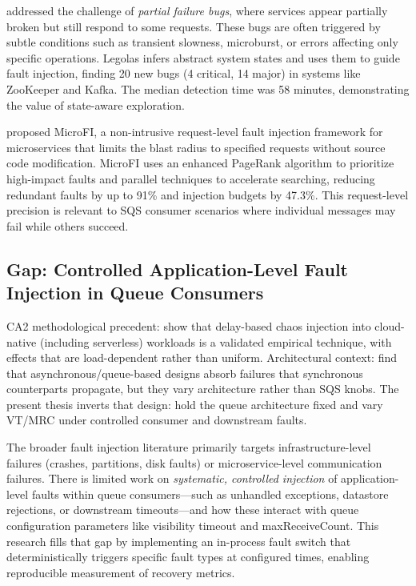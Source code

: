 \citet{Wu2024Legolas} addressed the challenge of \emph{partial failure bugs}, where services appear partially broken but still respond to some requests. These bugs are often triggered by subtle conditions such as transient slowness, microburst, or errors affecting only specific operations. Legolas infers abstract system states and uses them to guide fault injection, finding 20 new bugs (4 critical, 14 major) in systems like ZooKeeper and Kafka. The median detection time was 58 minutes, demonstrating the value of state-aware exploration.

\citet{Zhou2024MicroFI} proposed MicroFI, a non-intrusive request-level fault injection framework for microservices that limits the blast radius to specified requests without source code modification. MicroFI uses an enhanced PageRank algorithm to prioritize high-impact faults and parallel techniques to accelerate searching, reducing redundant faults by up to 91\% and injection budgets by 47.3\%. This request-level precision is relevant to SQS consumer scenarios where individual messages may fail while others succeed.

\subsection{Gap: Controlled Application-Level Fault Injection in Queue Consumers}

CA2 methodological precedent: \citet{AlSaidAhmad2024Chaos} show that delay-based chaos injection into cloud-native (including serverless) workloads is a validated empirical technique, with effects that are load-dependent rather than uniform. Architectural context: \citet{Bosilia2025AsyncResilience} find that asynchronous/queue-based designs absorb failures that synchronous counterparts propagate, but they vary architecture rather than SQS knobs. The present thesis inverts that design: hold the queue architecture fixed and vary VT/MRC under controlled consumer and downstream faults.

The broader fault injection literature primarily targets infrastructure-level failures (crashes, partitions, disk faults) or microservice-level communication failures. There is limited work on \emph{systematic, controlled injection} of application-level faults within queue consumers—such as unhandled exceptions, datastore rejections, or downstream timeouts—and how these interact with queue configuration parameters like visibility timeout and maxReceiveCount. This research fills that gap by implementing an in-process fault switch that deterministically triggers specific fault types at configured times, enabling reproducible measurement of recovery metrics.

